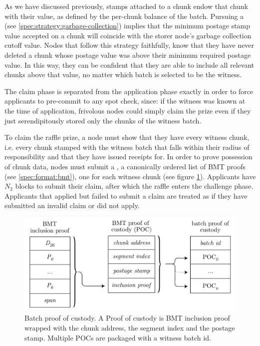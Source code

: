 As we have discussed previously, stamps attached to a chunk endow that chunk with their value, as defined by the per-chunk balance of the batch. Pursuing a  (see \ref{spec:strategy:garbage-collection}) implies that the minimum postage stamp value accepted on a chunk will coincide with the storer node's garbage collection cutoff value. Nodes that follow this strategy faithfully, know that they have never deleted a chunk whose postage value was above their minimum required postage value. In this way, they can be confident that they are able to include all relevant chunks above that value, no matter which batch is selected to be the witness.

The claim phase is separated from the application phase exactly in order to force applicants to pre-commit to any spot check, since: if the witness was known at the time of application, frivolous nodes could simply claim the prize even if they just serendipitously stored only the chunks of the witness batch.

To claim the raffle prize, a node must show that they have every witness chunk, i.e. every chunk stamped with the witness batch that falls within their radius of responsibility and that they have issued receipts for. In order to prove possession of chunk data, nodes must submit a , a canonically ordered list of BMT proofs (see \ref{spec:format:bmt}), one for each witness chunk (see figure 
\ref{fig:batch-proof-of-custody}). Applicants have $N_2$ blocks to submit their claim, after which the raffle enters the challenge phase. Applicants that applied but failed to submit a claim are treated as if they have  submitted an invalid claim or did not apply.


\begin{figure}[htbp]
  \centering
   \includegraphics[width=\textwidth]{fig/batch-proof-of-custody.pdf}
  \caption[Batch proof of custody \statusgreen]{Batch proof of custody. A Proof of custody is BMT inclusion proof wrapped with the chunk address, the segment index and the postage stamp. Multiple POCs are packaged with a witness batch id.}
  \label{fig:batch-proof-of-custody}
\end{figure}

